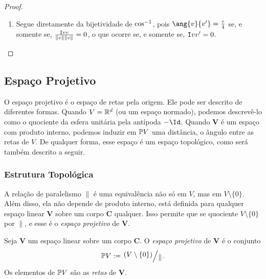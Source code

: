 \begin{proof}
\begin{enumerate}
	\item Segue diretamente da bijetividade de $\cos^{-1}$, pois $\ang{v}{v'} = \frac{\tau}{4}$ se, e somente se, $\frac{\mathtt I{v}{v}}{\left\Vert{v}\right\Vert\left\Vert{v}\right\Vert}=0$, o que ocorre se, e somente se, $\mathtt I{v}{v'}=0$. \qedhere
\end{enumerate}
\end{proof}




\subsection{Espaço Projetivo}

O espaço projetivo é o espaço de retas pela origem. Ele pode ser descrito de diferentes formas. Quando $V=\mathbb{R}^d$ (ou um espaço normado), podemos descrevê-lo como o quociente da esfera unitária pela antípoda $-\Id$. Quando $\bm V$ é um espaço com produto interno, podemos induzir em $\mathbb{P} V$ uma distância, o ângulo entre as retas de $V$. De qualquer forma, esse espaço é um espaço topológico, como será também descrito a seguir.

\subsubsection{Estrutura Topológica}

A relação de paralelismo $\parallel$ é uma equivalência não só em $V$, mas em $V \setminus \{0\}$. Além disso, ela não depende de produto interno, está definida para qualquer espaço linear $\bm V$ sobre um corpo $\bm C$ qualquer. Isso permite que se quociente $V \setminus \{0\}$ por $\parallel$, e esse é o \textit{espaço projetivo} de $\bm V$.

\begin{defi}
Seja $\bm V$ um espaço linear sobre um corpo $\bm C$. O \emph{espaço projetivo} de $\bm V$ é o conjunto
	\begin{equation*}
	\pro V := \quo{\left( V \setminus \{0\} \right)}{\parallel}.
	\end{equation*}
Os elementos de $\mathbb{P} V$ são as \emph{retas} de $\bm V$.
\end{defi}

